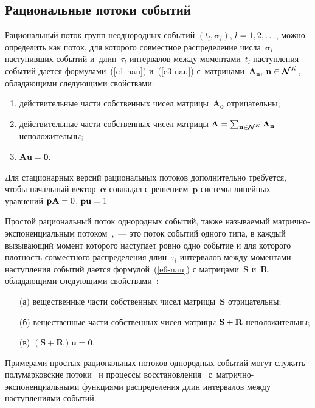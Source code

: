 \begin{multicols}{2}
\section{Рациональные потоки событий}

  Рациональный поток групп неоднородных событий 
$(t_l,\boldsymbol{\sigma}_l)$, $l\hm=1,2,\ldots$, можно определить как поток, 
для которого совместное распределение чис\-ла~$\boldsymbol{\sigma}_l$ 
наступивших событий и~длин~$\tau_l$ интервалов между моментами~$t_l$ 
наступления событий дается формулами~(\ref{e1-nau}) и~(\ref{e3-nau}) 
с~матрицами~$\mathbf{A}_{\mathbf{n}}$, $\mathbf{n}\hm\in 
\boldsymbol{\mathcal{N}}^K $, обладающими следующими свойствами:
  \begin{enumerate}[(1)]
\item действительные части собственных чисел мат\-ри\-цы~$\mathbf{A}_{\mathbf{0}}$ 
отрицательны;
\item действительные части собственных чисел мат\-ри\-цы 
$\mathbf{A}\hm= \sum\nolimits_{\mathbf{n}\in 
\boldsymbol{\mathcal{N}}^K} \mathbf{A}_{\mathbf{n}}$ 
неположительны;
\item $\mathbf{Au}=\mathbf{0}$.
\end{enumerate}
  
  Для стационарных версий рациональных потоков дополнительно требуется, 
чтобы начальный вектор~$\bm{\alpha}$ совпадал с решением~$\mathbf{p}$ 
системы линейных уравнений $\mathbf{pA}\hm=0$, $\mathbf{pu}\hm=1$.
  
  Простой рациональный поток однородных событий, также называемый  
мат\-рич\-но-экс\-по\-нен\-циальным потоком~\cite{30-nau},~--- это поток 
событий одного типа, в каждый вызывающий момент которого наступает 
ровно одно событие и для которого плотность совместного распределения 
длин~$\tau_l$ интервалов между моментами наступления событий дается 
формулой~(\ref{e6-nau}) с матрицами~$\mathbf{S}$ и~$\mathbf{R}$, 
обладающими следующими свойствами~\cite{31-nau}:
\begin{itemize}
\item[(а)] вещественные части собственных чисел матрицы~$\mathbf{S}$ 
отрицательны;
\item[(б)] вещественные части собственных чисел матрицы 
$\mathbf{S}\hm+\mathbf{R}$ неположительны; 
\item[(в)] $(\mathbf{S}+\mathbf{R})\mathbf{u}=\mathbf{0}$. 
  \end{itemize}
  
  Примерами простых рациональных потоков однородных событий могут 
служить полумарковские потоки~\cite{22-nau} и процессы 
восстановления~\cite{27-nau}  
с~мат\-рич\-но-экс\-по\-нен\-ци\-аль\-ны\-ми функциями распределения длин 
интервалов между наступлениями событий.
  

\end{multicols}
